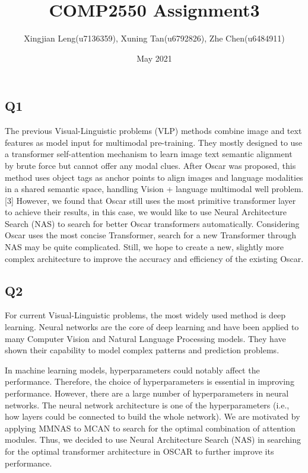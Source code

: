 \documentclass[12pt, a4paper]{article}
\title{COMP2550 Assignment3}
\author{Xingjian Leng(u7136359), Xuning Tan(u6792826), Zhe Chen(u6484911)}
\date{May 2021}
\begin{document}
    
\maketitle
\subsection{Q1}
The previous Visual-Linguistic problems (VLP) methods combine image and text features as model input for multimodal pre-training. They mostly designed to use a transformer self-attention mechanism to learn image text semantic alignment by brute force but cannot offer any modal clues. \cite{DBLP:journals/corr/abs-2004-06165} After Oscar was proposed, this method uses object tags as anchor points to align images and language modalities in a shared semantic space, handling Vision + language multimodal well problem. [3] However, we found that Oscar still uses the most primitive transformer layer to achieve their results, in this case, we would like to use Neural Architecture Search (NAS) to search for better Oscar transformers automatically. Considering Oscar uses the most concise Transformer, search for a new Transformer through NAS may be quite complicated. Still, we hope to create a new, slightly more complex architecture to improve the accuracy and efficiency of the existing Oscar.

\subsection*{Q2}

\par\noindent For current Visual-Linguistic problems, the most widely used method is deep learning. Neural networks are the core of deep learning and have been applied to many Computer Vision and Natural Language Processing models. They have shown their capability to model complex patterns and prediction problems.

\par\noindent \newline In machine learning models, hyperparameters could notably affect the performance. Therefore, the choice of hyperparameters is essential in improving performance. However, there are a large number of hyperparameters in neural networks. The neural network architecture is one of the hyperparameters (i.e., how layers could be connected to build the whole network). We are motivated by applying MMNAS \cite{DBLP:journals/corr/abs-2004-12070} to MCAN \cite{DBLP:journals/corr/abs-1906-10770} to search for the optimal combination of attention modules. Thus, we decided to use Neural Architecture Search (NAS) in searching for the optimal transformer architecture in OSCAR \cite{DBLP:journals/corr/abs-2004-06165} to further improve its performance.
\end{document}
